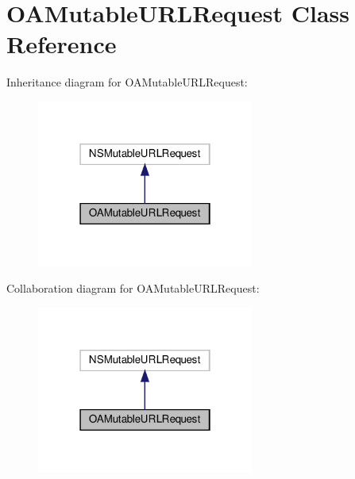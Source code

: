 \hypertarget{interfaceOAMutableURLRequest}{}\section{O\+A\+Mutable\+U\+R\+L\+Request Class Reference}
\label{interfaceOAMutableURLRequest}


Inheritance diagram for O\+A\+Mutable\+U\+R\+L\+Request\+:
\nopagebreak
\begin{figure}[H]
\begin{center}
\leavevmode
\includegraphics[width=202pt]{interfaceOAMutableURLRequest__inherit__graph}
\end{center}
\end{figure}


Collaboration diagram for O\+A\+Mutable\+U\+R\+L\+Request\+:
\nopagebreak
\begin{figure}[H]
\begin{center}
\leavevmode
\includegraphics[width=202pt]{interfaceOAMutableURLRequest__coll__graph}
\end{center}
\end{figure}
